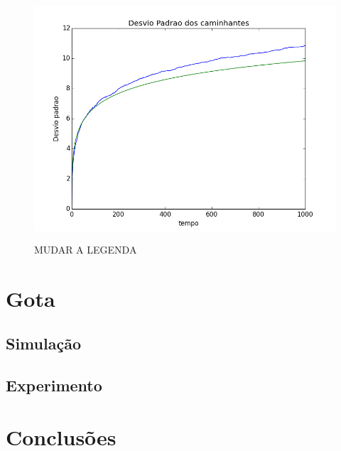 \documentclass[12pt,a4paper]{article}
\begin{document}
\begin{figure}[H]
\centering
\includegraphics[width=12cm,height=9cm]{imgs/2d/desvio.png}
\caption{MUDAR A LEGENDA}
\label{desvio2}
\end{figure}


\newpage
\section{Gota}
\subsection{Simulação}

\subsection{Experimento}


\newpage
\section{Conclusões}
\end{document}
